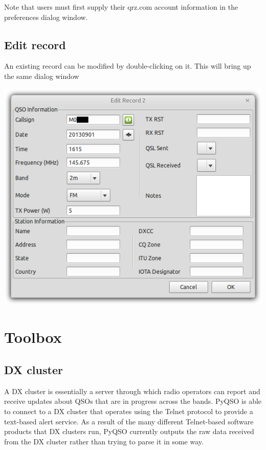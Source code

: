 \documentclass[11pt, a4paper]{report}
\begin{document}
Note that users must first supply their qrz.com account information in the preferences dialog window.

\section{Edit record}
An existing record can be modified by double-clicking on it. This will bring up the same dialog window 

\begin{center}
  \includegraphics[width=1\columnwidth]{images/edit_record.png}
\end{center}

\chapter{Toolbox}

\section{DX cluster}
A DX cluster is essentially a server through which radio operators can report and receive updates about QSOs that are in progress across the bands. PyQSO is able to connect to a DX cluster that operates using the Telnet protocol to provide a text-based alert service. As a result of the many different Telnet-based software products that DX clusters run, PyQSO currently outputs the raw data received from the DX cluster rather than trying to parse it in some way.
\end{document}

